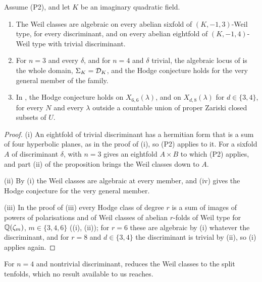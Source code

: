 \begin{theorem}\label{thm:weilsix}
Assume \textup{(P2)}, and let $K$ be an imaginary quadratic field.
\begin{enumerate}[label=\textup{(\roman*)},leftmargin=2.6em,itemsep=2pt]
\item The Weil classes are algebraic on every abelian sixfold of
  $(K,-1,3)$-Weil type, for every discriminant, and on every abelian
  eightfold of $(K,-1,4)$-Weil type with trivial discriminant.
\item For $n=3$ and every $\delta$, and for $n=4$ and $\delta$ trivial, the
  algebraic locus of  is the whole domain,
  $\Sigma_{K}=\mathcal{D}_{K}$, and the Hodge conjecture holds for the very general
  member of the family.
\item In , the Hodge conjecture holds on
  $X_{6,6}(\lambda)$, and on $X_{d,8}(\lambda)$ for $d\in\{3,4\}$, for every
  $N$ and every $\lambda$ outside a countable union of proper Zariski closed
  subsets of $U$.
\end{enumerate}
\end{theorem}

\begin{proof}
(i) An eightfold of trivial discriminant has a hermitian form that is a sum
of four hyperbolic planes, as in the proof of (i), so
\textup{(P2)} applies to it. For a sixfold $A$ of discriminant $\delta$,
 with $n=3$ gives an eightfold $A\times B$ to which
\textup{(P2)} applies, and part (ii) of the proposition brings the Weil
classes down to $A$.

(ii) By (i) the Weil classes are algebraic at every member, and
(iv) gives the Hodge conjecture for the very general member.

(iii) In the proof of (iii) every Hodge class of
degree $r$ is a sum of images of powers of polarisations and of Weil classes
of abelian $r$-folds of Weil type for $\mathbb{Q}(\zeta_{m})$, $m\in\{3,4,6\}$
((i), (ii)); for $r=6$ these are algebraic by (i)
whatever the discriminant, and for $r=8$ and $d\in\{3,4\}$ the discriminant
is trivial by (ii), so (i) applies again.
\end{proof}

For $n=4$ and nontrivial discriminant,  reduces the
Weil classes to the split tenfolds, which no result available to us
reaches.

